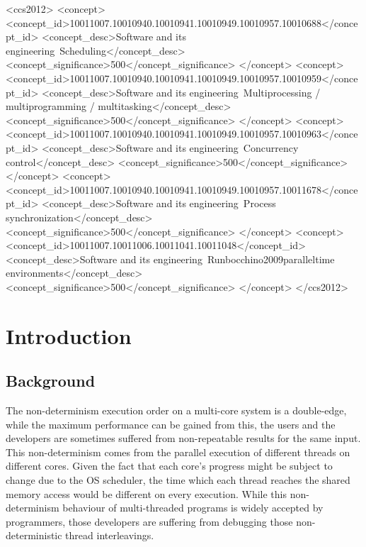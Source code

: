 \documentclass{sig-alternate}
\begin{document}
%
%
\begin{CCSXML}
<ccs2012>
<concept>
<concept_id>10011007.10010940.10010941.10010949.10010957.10010688</concept_id>
<concept_desc>Software and its engineering~Scheduling</concept_desc>
<concept_significance>500</concept_significance>
</concept>
<concept>
<concept_id>10011007.10010940.10010941.10010949.10010957.10010959</concept_id>
<concept_desc>Software and its engineering~Multiprocessing / multiprogramming / multitasking</concept_desc>
<concept_significance>500</concept_significance>
</concept>
<concept>
<concept_id>10011007.10010940.10010941.10010949.10010957.10010963</concept_id>
<concept_desc>Software and its engineering~Concurrency control</concept_desc>
<concept_significance>500</concept_significance>
</concept>
<concept>
<concept_id>10011007.10010940.10010941.10010949.10010957.10011678</concept_id>
<concept_desc>Software and its engineering~Process synchronization</concept_desc>
<concept_significance>500</concept_significance>
</concept>
<concept>
<concept_id>10011007.10011006.10011041.10011048</concept_id>
<concept_desc>Software and its engineering~Runbocchino2009paralleltime environments</concept_desc>
<concept_significance>500</concept_significance>
</concept>
</ccs2012>
\end{CCSXML}

%
%


\section{Introduction}
\subsection{Background}
The non-determinism execution order on a multi-core system is a double-edge, while the maximum performance can be gained from this, the users and the developers are sometimes suffered from non-repeatable results for the same input. This non-determinism comes from the parallel execution of different threads on different cores. Given the fact that each core's progress might be subject to change due to the OS scheduler, the time which each thread reaches the shared memory access would be different on every execution. While this non-determinism behaviour of multi-threaded programs is widely accepted by programmers, those developers are suffering from debugging those non-deterministic thread interleavings.
\end{document}
